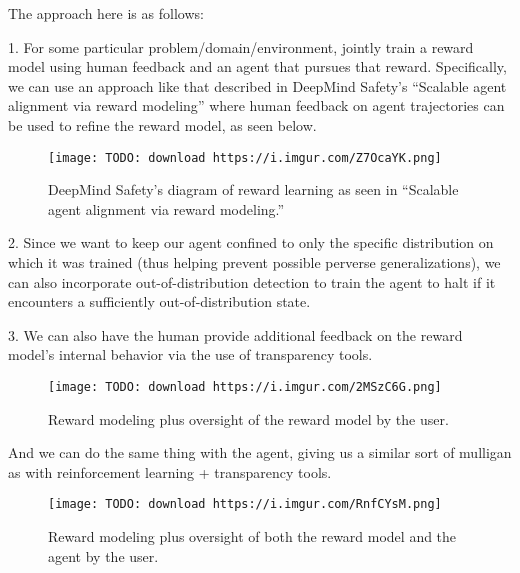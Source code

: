 The approach here is as follows:

1. For some particular problem/domain/environment, jointly train a reward model using human feedback and an agent that pursues that reward. Specifically, we can use an approach like that described in DeepMind Safety's ``Scalable agent alignment via reward modeling\cite{TODO: cite https://medium.com/@deepmindsafetyresearch/scalable-agent-alignment-via-reward-modeling-bf4ab06dfd84}'' where human feedback on agent trajectories can be used to refine the reward model, as seen below.

\begin{figure}[h!]
  \centering
  \texttt{[image: TODO: download https://i.imgur.com/Z7OcaYK.png]}
  \caption{DeepMind Safety's diagram of reward learning as seen in ``Scalable agent alignment via reward modeling\cite{TODO: cite https://medium.com/@deepmindsafetyresearch/scalable-agent-alignment-via-reward-modeling-bf4ab06dfd84}.''}
\end{figure}

2. Since we want to keep our agent confined to only the specific distribution on which it was trained (thus helping prevent possible perverse generalizations), we can also incorporate out-of-distribution detection\cite{TODO: cite https://ai.googleblog.com/2019/12/improving-out-of-distribution-detection.html} to train the agent to halt if it encounters a sufficiently out-of-distribution state.

3. We can also have the human provide additional feedback on the reward model's internal behavior via the use of transparency tools.

\begin{figure}[h!]
  \centering
  \texttt{[image: TODO: download https://i.imgur.com/2MSzC6G.png]}
  \caption{Reward modeling plus oversight of the reward model by the user.}
\end{figure}

And we can do the same thing with the agent, giving us a similar sort of mulligan as with reinforcement learning + transparency tools.

\begin{figure}[h!]
  \centering
  \texttt{[image: TODO: download https://i.imgur.com/RnfCYsM.png]}
  \caption{Reward modeling plus oversight of both the reward model and the agent by the user.}
\end{figure}

